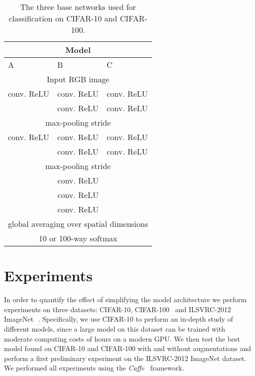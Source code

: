 \documentclass{article} \usepackage{iclr2015,times}
\begin{document}
\begin{table}[h]
\caption{The three base networks used for classification on CIFAR-10
  and CIFAR-100.}
\label{base-models}
\begin{center}
\begin{small}
\begin{tabular}{l|l|l}
\multicolumn{3}{c}{\bf Model} \\
\hline
A         &B & C \\
\hline
\multicolumn{3}{c}{Input  RGB image} \\
\hline
 conv.  ReLU &  conv.  ReLU &  conv.  ReLU \\
 &  conv.  ReLU &  conv.  ReLU \\
\hline 
\multicolumn{3}{c}{ max-pooling stride } \\ 
\hline
 conv.  ReLU &  conv.  ReLU &  conv.  ReLU \\
 &  conv.  ReLU &  conv.  ReLU \\
\hline
\multicolumn{3}{c}{ max-pooling stride } \\
\hline
\multicolumn{3}{c}{ conv.  ReLU} \\
\hline
\multicolumn{3}{c}{ conv.  ReLU} \\
\hline
\multicolumn{3}{c}{ conv.  ReLU} \\
\hline
\multicolumn{3}{c}{global averaging over  spatial dimensions} \\
\hline
\multicolumn{3}{c}{10 or 100-way softmax} \\
\end{tabular}
\end{small}
\end{center}
\end{table}

\section{Experiments}
In order to quantify the effect of simplifying the model architecture
we perform experiments on three datasets: CIFAR-10, CIFAR-100~\citep{Krizhevsky2009} and ILSVRC-2012 ImageNet~\citep{Imagenet_2009}\,. Specifically, we use CIFAR-10 to perform an in-depth
study of different models, since a large model on this dataset can be trained with
moderate computing costs of  hours on a modern GPU. We
then test the best model found on CIFAR-10 and CIFAR-100 with and
without augmentations and perform a first preliminary experiment on
the ILSVRC-2012 ImageNet dataset. We performed all experiments using the \emph{Caffe}~\citep{caffe} framework.
\end{document}
